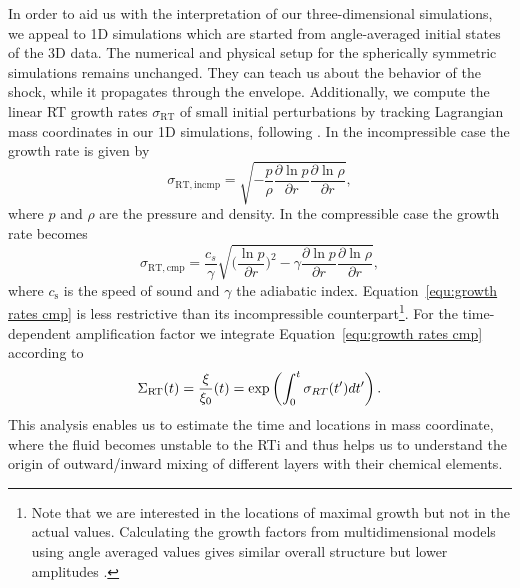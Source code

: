 \documentclass[fleqn,usenatbib]{mnras}
\newcommand{\GEO}[1]{{\color{red}#1}}
\begin{document}
In order to aid us with the interpretation of our three-dimensional simulations, we appeal to 1D simulations which are started from angle-averaged initial states of the 3D data. The numerical and physical setup for the spherically symmetric simulations remains unchanged. 
They can teach us about the behavior of the shock, while it propagates through the envelope. 
Additionally, we compute the linear RT growth rates $\sigma_{\mathrm{RT}}$ of small initial perturbations by tracking Lagrangian mass coordinates in our 1D simulations, following \cite{Mueller1991}. 
In the incompressible case the growth rate is given by
\begin{equation}
  \label{equ:growth rates incmp}
  \sigma_{\mathrm{RT,incmp}} = \sqrt{- \frac{p}{\rho}\frac{\partial \ln p}{\partial r}\frac{\partial \ln \rho}{\partial r}},
\end{equation}
where $p$ and $\rho$ are the pressure and density. In the compressible case the growth rate becomes
\begin{equation}
  \sigma_{\mathrm{RT, cmp}} = \frac{c_{s}}{\gamma}\sqrt{\Big(\frac{\ln p}{\partial r}\Big)^ 2 - \gamma \frac{\partial \ln p}{\partial r}\frac{\partial \ln \rho}{\partial r}},
  \label{equ:growth rates cmp}
\end{equation}
where $c_{\mathrm{s}}$ is the speed of sound and $\gamma$ the adiabatic index. Equation~\ref{equ:growth rates cmp} is less restrictive than its incompressible counterpart\footnote{Note that we are interested in the locations of maximal growth but not in the actual values. Calculating the growth factors from multidimensional models using angle averaged values gives similar overall structure but lower amplitudes \citep{Mueller2018}.}. 
For the time-dependent amplification factor we integrate Equation~\ref{equ:growth rates cmp} according to
\begin{equation}
  \Sigma_{\rm RT}(t) = \frac{\xi}{\xi_0}(t) = \exp \left(\int_0^t \sigma_{RT} (t') dt' \right).\label{equ:growth rates int}
\end{equation}
This analysis enables us to estimate the time and locations in mass coordinate, where the fluid becomes unstable to the RTi and thus helps us to understand the origin of outward/inward mixing of \GEO{different layers with their chemical elements}.
\end{document}
